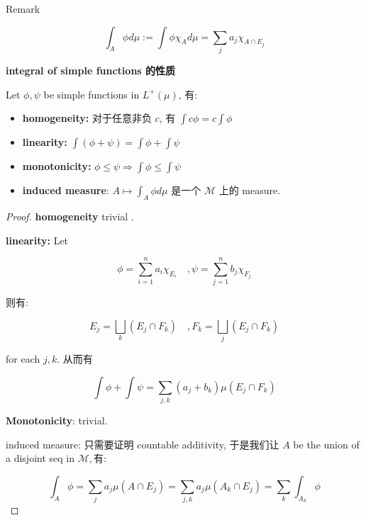 \documentclass{qlnotes-export}
\begin{document}
\begin{qlremark}{Remark}

\[\int_{A}\phi d\mu := \int\phi\chi_{A} d\mu = \sum\limits_{j}a_{j}\chi_{A \cap E_{j}}\]

\end{qlremark}

\begin{proposition}{\protect{}\label{kn-integral-of-simple-functions}{\textbf{integral
of simple functions 的性质}}}

Let \(\phi,\psi\) be simple functions in \(L^{+}(\mu)\), 有:

\begin{itemize}
\item
  \textbf{homogeneity:} 对于任意非负 \(c\), 有 \(\int c\phi = c\int\phi\)
\item
  \textbf{linearity:} \(\int(\phi + \psi) = \int\phi + \int\psi\)
\item
  \textbf{monotonicity:} \(\phi \leq \psi\Longrightarrow\int\phi \leq \int\psi\)
\item
  \textbf{induced measure}: \(A\mapsto\int_{A}\phi d\mu\) 是一个 \(\mathcal{M}\) 上的 measure.
\end{itemize}

\end{proposition}

\begin{proof}

\textbf{homogeneity} trivial .

\textbf{linearity:} Let

\[\phi = \sum\limits_{i = 1}^{n}a_{i}\chi_{E_{i}}\quad,\psi = \sum\limits_{j = 1}^{n}b_{j}\chi_{F_{j}}\]

则有:

\[E_{j} = \bigsqcup\limits_{k}(E_{j} \cap F_{k})\quad,F_{k} = \bigsqcup\limits_{j}(E_{j} \cap F_{k})\]

for each \(j,k\). 从而有

\[\int\phi + \int\psi = \sum\limits_{j,k}(a_{j} + b_{k})\mu(E_{j} \cap F_{k})\]

\textbf{Monotonicity}: trivial.

induced measure: 只需要证明 countable additivity, 于是我们让 \(A\) be the union of a disjoint seq in \(\mathcal{M},有:\)

\[\int_{A}\phi = \sum\limits_{j}a_{j}\mu(A \cap E_{j}) = \sum\limits_{j,k}a_{j}\mu(A_{k} \cap E_{j}) = \sum\limits_{k}\int_{A_{k}}\phi\]

\end{proof}
\end{document}
